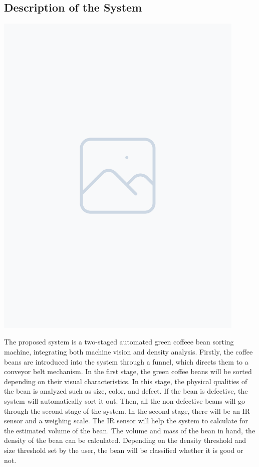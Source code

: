 \subsection{Description of the System}
\includegraphics[width=0.9\textwidth]{figure/placeholder.png} 

The proposed system is a two-staged automated green coffeee bean sorting machine, integrating both machine vision and density analysis. Firstly, the coffee beans are introduced into the system through a funnel, which directs them to a conveyor belt mechanism.  In the first stage, the green coffee beans will be sorted depending on their visual characteristics. In this stage, the physical qualities of the bean is analyzed such as size, color, and defect. If the bean is defective, the system will automatically sort it out. Then, all the non-defective beans will go through the second stage of the system. In the second stage, there will be an IR sensor and a weighing scale. The IR sensor will help the system to calculate for the estimated volume of the bean. The volume and mass of the bean in hand, the density of the bean can be calculated. Depending on the density threshold and size threshold set by the user, the bean will be classified whether it is good or not.

